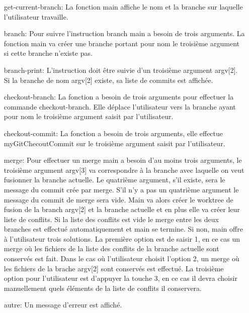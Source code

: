 \documentclass[11pt,francais]{article}
\begin{document}
\begin{itemize}
\item[get-current-branch:] La fonction main affiche le nom et la branche sur laquelle l'utilisateur travaille.
\item[branch:] Pour suivre l'instruction branch main a besoin de trois arguments. La fonction main va créer une branche  portant pour nom le troisième argument si cette branche n'existe pas.
\item[branch-print:] L'instruction doit être suivie d'un troisième argument argv[2]. Si la branche de nom argv[2] existe, sa liste de commits est affichée.
\item[checkout-branch:] La fonction a besoin de trois arguments pour effectuer la commande checkout-branch. Elle déplace l'utilisateur vers la branche ayant pour nom le troisième argument saisit par l'utilisateur.
\item[checkout-commit:] La fonction a besoin de trois arguments, elle effectue myGitChecoutCommit sur le troisième argument saisit par l'utilisateur.
\item[merge:] Pour effectuer un merge main a besoin d'au moins trois arguments, le troisième argument argv[3] va correspondre à la branche avec laquelle on veut fusionner la branche actuelle. Le quatrième argument, s'il existe, sera le message du commit crée par merge. S'il n'y a pas un quatrième argument le message du commit de merge sera vide. Main va alors créer le worktree de fusion de la branch argv[2] et la branche actuelle et en plus elle va créer leur liste de conflits. Si la liste des conflits est vide le merge entre les deux branches est effectué automatiquement et main se termine. Si non, main offre à l'utilisateur trois solutions. La première option est de saisir 1, en ce cas un merge où les fichiers de la liste des conflits de la branche actuelle sont conservés est fait.  Dans le cas où l'utilisateur choisit l'option 2, un merge où les fichiers de la brache argv[2] sont conservés est effectué. La troisième option pour l'utilisateur est d'appuyer la touche 3, en ce cas il devra choisir manuellement quels éléments de la liste de conflits il conservera.
\item[autre:] Un message d'erreur est affiché.


\end{itemize}
\end{document}
